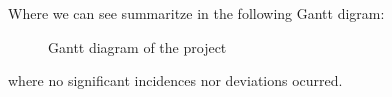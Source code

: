 \newpage
Where we can see summaritze in the following Gantt digram:
\begin{figure}[H]
    
    \caption[Project's Gantt diagram]{\footnotesize{Gantt diagram of the project}}
    \label{fig:gantt}
\end{figure}
where no significant incidences nor deviations ocurred.
\bigskip

